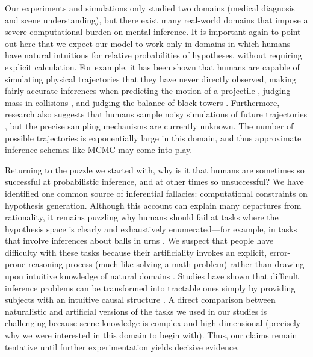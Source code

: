 Our experiments and simulations only studied two domains (medical diagnosis and scene understanding), but there exist many real-world domains that impose a severe computational burden on mental inference. 
It is important again to point out here that we expect our model to work only in domains in which humans have natural intuitions for relative probabilities of hypotheses, without requiring explicit calculation. 
For example, it has been shown that humans are capable of simulating physical trajectories that they have never directly observed, making fairly accurate inferences when predicting the motion of a projectile \citep{motion}, judging mass in collisions \citep{collision}, and judging the balance of block towers \citep{blocks}. Furthermore, research also suggests that humans sample noisy simulations of future trajectories \citep{smith2013sources,hamrick2015think}, but the precise sampling mechanisms are currently unknown. The number of possible trajectories is exponentially large in this domain, and thus approximate inference schemes like MCMC may come into play.


Returning to the puzzle we started with, why is it that humans are sometimes so successful at probabilistic inference, and at other times so unsuccessful? We have identified one common source of inferential fallacies: computational constraints on hypothesis generation. Although this account can explain many departures from rationality, it remains puzzling why humans should fail at tasks where the hypothesis space is clearly and exhaustively enumerated---for example, in tasks that involve inferences about balls in urns \citep[see][for a review]{peterson1967man}. We suspect that people have difficulty with these tasks because their artificiality invokes an explicit, error-prone reasoning process (much like solving a math problem) rather than drawing upon intuitive knowledge of natural domains \citep{evans02,cohen16}. Studies have shown that difficult inference problems can be transformed into tractable ones simply by providing subjects with an intuitive causal structure \citep{tversky80,krynski07,cheng85}. A direct comparison between naturalistic and artificial versions of the tasks we used in our studies is challenging because scene knowledge is complex and high-dimensional (precisely why we were interested in this domain to begin with). Thus, our claims remain tentative until further experimentation yields decisive evidence.